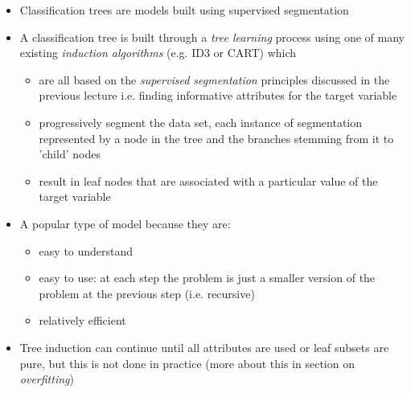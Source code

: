 \newpage
\vspace{-0.5em}
\begin{itemize}
\item Classification trees are models built using supervised segmentation
\item A classification tree is built through a \emph{tree learning} process using one of many existing \emph{induction algorithms} (e.g. ID3 or CART) which 
  \begin{itemize}
  \item are all based on the \emph{supervised segmentation} principles discussed in the previous lecture i.e. finding informative attributes for the target variable
  \item progressively segment the data set, each instance of segmentation represented by a node in the tree and the branches stemming from it to 'child' nodes
  \item result in leaf nodes that are associated with a particular value of the target variable 
  \end{itemize}
\item A popular type of model because they are:
  \begin{itemize}
  \item easy to understand
  \item easy to use: at each step the problem is just a smaller version of the problem at the previous step (i.e. recursive)
  \item relatively efficient
  \end{itemize}
\item Tree induction can continue until all attributes are used or leaf subsets are pure, but this is not done in practice (more about this in section on \emph{overfitting})
\end{itemize} 


